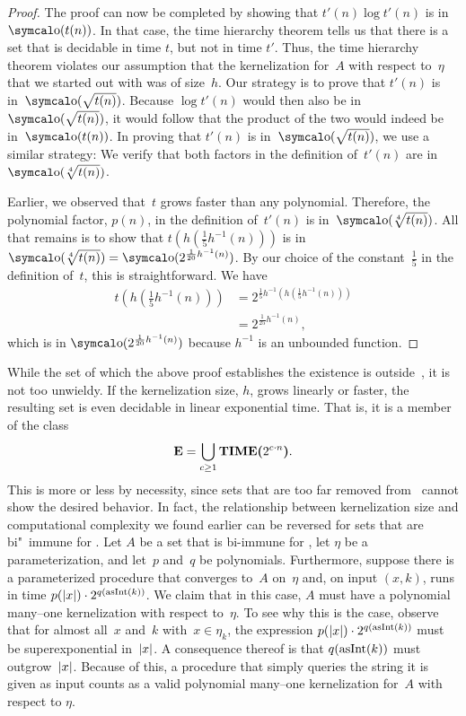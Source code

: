 \begin{proof}
  The proof can now be completed by showing that $t'(n) \log t'(n)$ is in $\littleo(t(n))$.
  In that case, the time hierarchy theorem tells us that there is a set that is decidable in time $t$, but not in time $t'$.
  Thus, the time hierarchy theorem violates our assumption that the kernelization for~$A$ with respect to~$\eta$ that we started out with was of size~$h$.
  Our strategy is to prove that $t'(n)$ is in~$\littleo(\sqrt{t(n)})$.
  Because $\log t'(n)$ would then also be in~$\littleo(\sqrt{t(n)})$, it would follow that the product of the two would indeed be in~$\littleo(t(n))$.
  In proving that $t'(n)$ is in~$\littleo(\sqrt{t(n)})$, we use a similar strategy:
  We verify that both factors in the definition of~$t'(n)$ are in~$\littleo(\sqrt[4]{t(n)})$.

  Earlier, we observed that~$t$ grows faster than any polynomial.
  Therefore, the polynomial factor, $p(n)$, in the definition of~$t'(n)$ is in~$\littleo(\sqrt[4]{t(n)})$.
  All that remains is to show that $t(h(\frac{1}{5} h^{-1}(n)))$ is in $\littleo(\sqrt[4]{t(n)}) = \littleo(2^{\frac{1}{20} h^{-1}(n)})$.
  By our choice of the constant~$\frac{1}{5}$ in the definition of~$t$, this is straightforward.
  We have
  \begin{align*}
    t(h(\tfrac{1}{5} h^{-1}(n))) &= 2^{\frac{1}{5} h^{-1}(h(\frac{1}{5} h^{-1}(n)))} \\
      &= 2^{\frac{1}{25} h^{-1}(n)},
  \end{align*}
  which is in $\littleo(2^{\frac{1}{20} h^{-1}(n)})$ because $h^{-1}$ is an unbounded function.
\end{proof}

While the set of which the above proof establishes the existence is outside~, it is not too unwieldy.
If the kernelization size, $h$, grows linearly or faster, the resulting set is even decidable in linear exponential time.
That is, it is a member of the class
\begin{equation*}
  \textnormal{\textbf{E}} = \bigcup_{c \ge 1} \textnormal{\textbf{TIME($2^{c \cdot n}$)}}.
\end{equation*}
This is more or less by necessity, since sets that are too far removed from~ cannot show the desired behavior.
In fact, the relationship between kernelization size and computational complexity we found earlier can be reversed for sets that are bi"~immune for .
Let $A$ be a set that is bi-immune for , let $\eta$ be a parameterization, and let~$p$ and~$q$ be polynomials.
Furthermore, suppose there is a parameterized procedure that converges to~$A$ on~$\eta$ and, on input $(x, k)$, runs in time $p({\lvert x\rvert}) \cdot 2^{q(\operatorname{asInt}(k))}$.
We claim that in this case, $A$ must have a polynomial many--one kernelization with respect to~$\eta$.
To see why this is the case, observe that for almost all~$x$ and~$k$ with~$x \in \eta_k$, the expression $p({\lvert x\rvert}) \cdot 2^{q(\operatorname{asInt}(k))}$ must be superexponential in~${\lvert x\rvert}$.
A consequence thereof is that $q(\operatorname{asInt}(k))$ must outgrow~${\lvert x\rvert}$.
Because of this, a procedure that simply queries the string it is given as input counts as a valid polynomial many--one kernelization for~$A$ with respect to $\eta$.

